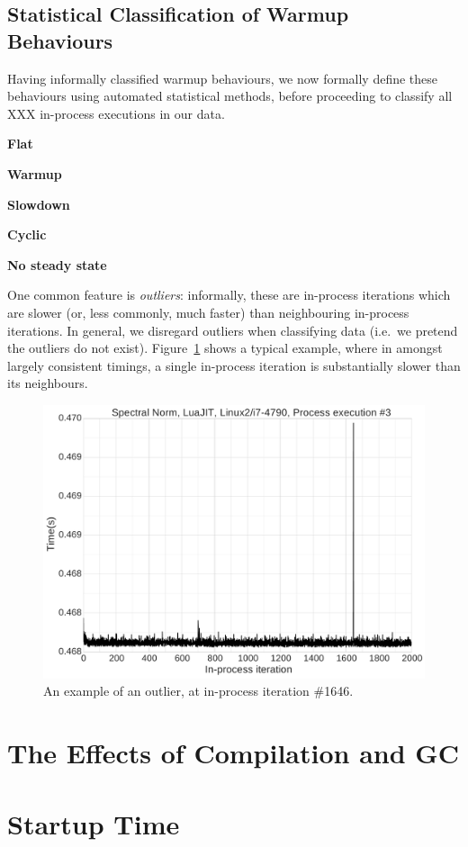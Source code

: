 \documentclass[preprint,numbers,10pt]{sigplanconf}
\begin{document}
\subsection{Statistical Classification of Warmup Behaviours}

Having informally classified warmup behaviours, we now formally define these
behaviours using automated statistical methods, before proceeding to classify
all XXX in-process executions in our data.


\textbf{Flat}

\textbf{Warmup}

\textbf{Slowdown}

\textbf{Cyclic}

\textbf{No steady state}

One common feature is \emph{outliers}: informally, these are in-process
iterations which are slower (or, less commonly, much faster) than neighbouring
in-process iterations. In general, we disregard outliers when classifying data
(i.e.~we pretend the outliers do not exist).
Figure~\ref{fig:examples:outliers1} shows a typical example, where in amongst
largely consistent timings, a single in-process iteration is substantially
slower than its neighbours.


\begin{figure}[tbp]
\includegraphics[width=.475\textwidth]{examples/outliers1}
\caption{An example of an outlier, at in-process iteration \#1646.}
\label{fig:examples:outliers1}
\end{figure}


\section{The Effects of Compilation and GC}
\label{sec:deepdive}



\section{Startup Time}
\label{sec:startup}
\end{document}
